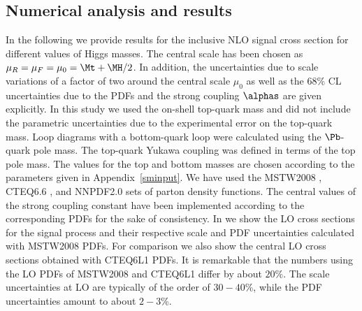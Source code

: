 \subsection{Numerical analysis and results}
In the following we provide results for the inclusive NLO signal
cross section for different values of Higgs masses. The central scale
has been chosen as $\mu_R=\mu_F=\mu_0=\Mt+\MH/2$. In addition, the
uncertainties due to scale variations of a factor of two around the
central scale $\mu_0$ as well as the 68\% CL uncertainties due to the
PDFs and the strong coupling $\alphas$ are given explicitly.  
In this study we used the on-shell top-quark mass and did not include
the parametric uncertainties due to the experimental error on the
top-quark mass. Loop diagrams with a bottom-quark loop were calculated
using the $\Pb$-quark pole mass. The top-quark Yukawa coupling was defined
in terms of the top pole mass. The values for the top and bottom masses
are chosen according to the parameters given in Appendix~\ref{sminput}.  
We have used the MSTW2008
\cite{Martin:2009iq,Martin:2009bu}, CTEQ6.6 \cite{Pumplin:2002vw}, and
NNPDF2.0 \cite{Ball:2010de} sets of parton density functions.  The
central values of the strong coupling constant have been implemented
according to the corresponding PDFs for the sake of consistency.
In  we show the LO cross sections for the signal
process and their respective scale and PDF uncertainties calculated with
MSTW2008 PDFs. For comparison we also show the central LO cross sections
obtained with CTEQ6L1 PDFs. It is remarkable that the numbers using the
LO PDFs of MSTW2008 and CTEQ6L1 differ by about $20\%$. The scale
uncertainties at LO are typically of the order of $30{-}40\%$, while the
PDF uncertainties amount to about $2{-}3$\%.

